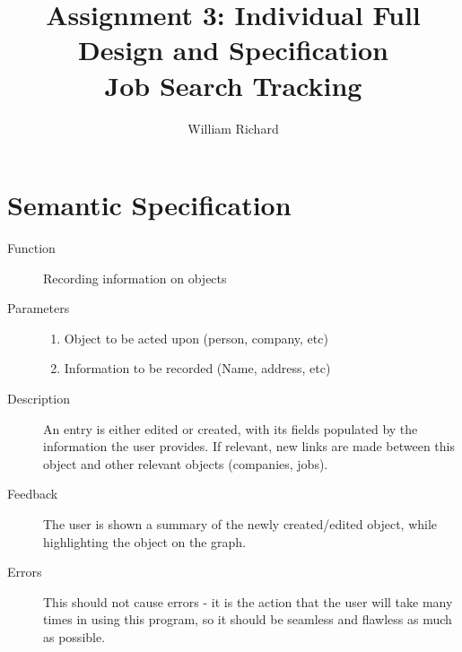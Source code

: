 \documentclass[12pt, letter]{article}
\title{Assignment 3: Individual Full Design and Specification  \\ Job Search Tracking}
\author{William Richard}
\begin{document}
\maketitle

\section{Semantic Specification}



\begin{description}
\item[Function] Recording information on objects
\item[Parameters] \hfill
\begin{enumerate} \item Object to be acted upon (person, company, etc) \item Information to be recorded (Name, address, etc) \end{enumerate}
\item[Description]
	An entry is either edited or created, with its fields populated by the information the user provides.  If relevant, new links are made between this object and other relevant objects (companies, jobs).
\item[Feedback] 	The user is shown a summary of the newly created/edited object, while highlighting the object on the graph.
\item[Errors] 	This should not cause errors - it is the action that the user will take many times in using this program, so it should be seamless and flawless as much as possible.
\end{description}

\hfill
\end{document}
